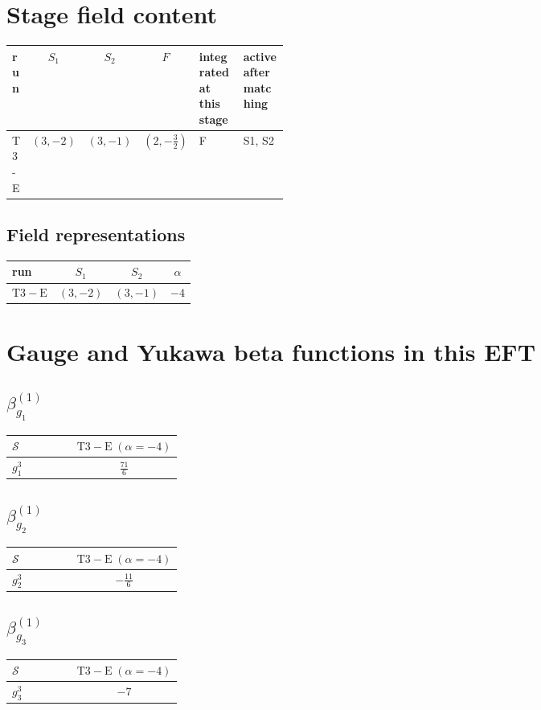 \documentclass[9pt]{article}
\begin{document}
\section*{Stage field content}
\begin{longtable}{@{}lccc p{0.20\linewidth}p{0.20\linewidth}@{}}
\toprule
run & $S_1$ & $S_2$ & $F$ & integrated at this stage & active after matching \\
\midrule
T3-E & $(3,-2)$ & $(3,-1)$ & $(2,- \frac{3}{2})$ & F & S1, S2 \\
\bottomrule
\end{longtable}
\subsection*{Field representations}
\begin{longtable}{@{}lccc@{}}
\toprule
run & $S_1$ & $S_2$ & $\alpha$ \\
\midrule
$\mathrm{T3-E}$ & $(3,-2)$ & $(3,-1)$ & $-4$ \\
\bottomrule
\end{longtable}
\section*{Gauge and Yukawa beta functions in this EFT}
\subsection*{$ \beta_{g_1}^{(1)} $}
\begin{longtable}{@{}p{0.38\linewidth}c@{}}
\toprule
$\mathcal{S}$ & $ \mathrm{T3-E}\;(\alpha=-4) $ \\
\midrule
$ g_1^3 $ & $ \frac{71}{6} $ \\
\bottomrule
\end{longtable}
\subsection*{$ \beta_{g_2}^{(1)} $}
\begin{longtable}{@{}p{0.38\linewidth}c@{}}
\toprule
$\mathcal{S}$ & $ \mathrm{T3-E}\;(\alpha=-4) $ \\
\midrule
$ g_2^3 $ & $ - \frac{11}{6} $ \\
\bottomrule
\end{longtable}
\subsection*{$ \beta_{g_3}^{(1)} $}
\begin{longtable}{@{}p{0.38\linewidth}c@{}}
\toprule
$\mathcal{S}$ & $ \mathrm{T3-E}\;(\alpha=-4) $ \\
\midrule
$ g_3^3 $ & $ -7 $ \\
\bottomrule
\end{longtable}
\end{document}
